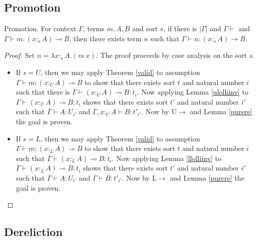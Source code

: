 \documentclass[sigplan,screen,review,anonymous]{acmart}
\newcommand{\rname}[1]{\textsc{\footnotesize #1}}
\newcommand{\pure}[1]{|#1|}
\newcommand{\utype}{:_{\scriptscriptstyle U}}
\newcommand{\ltype}{:_{\scriptscriptstyle L}}
\newcommand{\stype}[1]{:_#1}
\begin{document}
\subsection{Promotion}
\begin{theorem}\label{promotion}
  Promotion. For context $\Gamma$, terms $m, A, B$ and sort $s$, if there is $\pure{\Gamma}$ and $\Gamma \vdash$ and $\Gamma \vdash m : (x \stype{s} A) \multimap B$, then there exists term $n$ such that $\Gamma \vdash n : (x \stype{s} A) \rightarrow B$.
\end{theorem}
\begin{proof}
  Set $n = \lambda x \stype{s} A. (m\ x)$. The proof proceeds by case analysis on the sort $s$.
  \begin{itemize}
    \item If $s = U$, then we may apply Theorem \ref{valid} to assumption $\Gamma \vdash m : (x \utype A) \multimap B$ to show that there exists sort $t$ and natural number $i$ such that there is $\overline{\Gamma} \vdash (x \utype A) \multimap B : t_i$. Now applying Lemma \ref{ulolliinv} to $\overline{\Gamma} \vdash (x \utype A) \multimap B : t_i$ shows that there exists sort $t'$ and natural number $i'$ such that $\overline{\Gamma} \vdash A : U_{i'}$ and $\overline{\Gamma}, x \utype A \vdash B : t'_{i'}$. Now by \rname{U$\rightarrow$} and Lemma \ref{purere} the goal is proven.
    \item If $s = L$, then we may apply Theorem \ref{valid} to assumption $\Gamma \vdash m : (x \ltype A) \multimap B$ to show that there exists sort $t$ and natural number $i$ such that $\overline{\Gamma} \vdash (x \ltype A) \multimap B : t_i$. Now applying Lemma \ref{llolliinv} to $\overline{\Gamma} \vdash (x \ltype A) \multimap B : t_i$ shows that there exists sort $t'$ and natural number $i'$ such that $\overline{\Gamma} \vdash A : U_{i'}$ and $\overline{\Gamma} \vdash B : t'_{i'}$. Now by \rname{L$\rightarrow$} and Lemma \ref{purere} the goal is proven.
  \end{itemize}
\end{proof}

\subsection{Dereliction}
\end{document}
